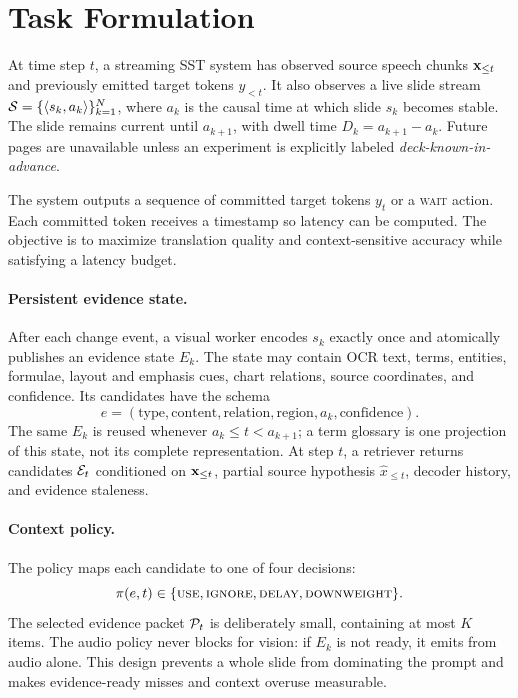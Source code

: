 \section{Task Formulation}
\label{sec:task}

At time step $t$, a streaming SST system has observed source speech chunks
$\mathbf{x}_{\leq t}$ and previously emitted target tokens $y_{<t}$. It also
observes a live slide stream
$\mathcal{S}=\{\langle s_k,a_k\rangle\}_{k=1}^{N}$, where $a_k$ is
the causal time at which slide $s_k$ becomes stable. The slide remains current
until $a_{k+1}$, with dwell time $D_k=a_{k+1}-a_k$. Future pages are unavailable
unless an experiment is explicitly labeled \emph{deck-known-in-advance}.

The system outputs a sequence of committed target tokens $y_t$ or a \textsc{wait} action.  Each committed token receives a timestamp so latency can be computed.  The objective is to maximize translation quality and context-sensitive accuracy while satisfying a latency budget.

\paragraph{Persistent evidence state.}
After each change event, a visual worker encodes $s_k$ exactly once and
atomically publishes an evidence state $E_k$. The state may contain OCR text,
terms, entities, formulae, layout and emphasis cues, chart relations, source
coordinates, and confidence. Its candidates have the schema
\begin{equation}
    e = (\mathrm{type}, \mathrm{content}, \mathrm{relation},
    \mathrm{region}, a_k, \mathrm{confidence}).
\end{equation}
The same $E_k$ is reused whenever $a_k\leq t<a_{k+1}$; a term
glossary is one projection of this state, not its complete representation. At
step $t$, a retriever returns candidates $\mathcal{E}_t$ conditioned on
$\mathbf{x}_{\leq t}$, partial source hypothesis $\hat{x}_{\leq t}$, decoder
history, and evidence staleness.

\paragraph{Context policy.}
The policy maps each candidate to one of four decisions:
\begin{equation}
    \pi(e, t) \in \{\textsc{use}, \textsc{ignore}, \textsc{delay}, \textsc{downweight}\}.
\end{equation}
The selected evidence packet $\mathcal{P}_t$ is deliberately small, containing at
most $K$ items. The audio policy never blocks for vision: if $E_k$ is not ready,
it emits from audio alone. This design prevents a whole slide from dominating
the prompt and makes evidence-ready misses and context overuse measurable.

